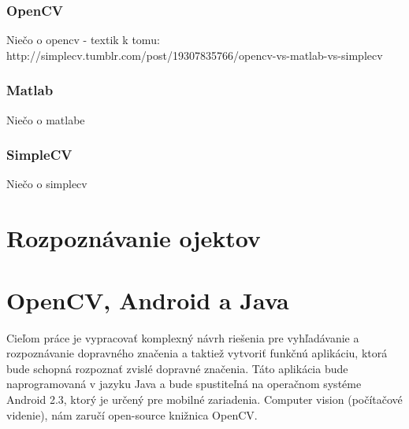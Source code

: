\documentclass[12pt]{article}
\begin{document}
\subsubsection{OpenCV}
Niečo o opencv - textik k tomu:
http://simplecv.tumblr.com/post/19307835766/opencv-vs-matlab-vs-simplecv
\subsubsection{Matlab}
Niečo o matlabe
\subsubsection{SimpleCV}
Niečo o simplecv

\section{Rozpoznávanie ojektov}
\section{OpenCV, Android a Java}
Cieľom práce je vypracovať komplexný návrh riešenia pre vyhľadávanie a rozpoznávanie dopravného značenia a taktiež vytvoriť funkčnú aplikáciu, ktorá
bude schopná rozpoznať zvislé dopravné značenia. Táto aplikácia bude naprogramovaná v jazyku Java a bude spustiteľná na
 operačnom systéme Android 2.3, ktorý je určený pre mobilné zariadenia. Computer vision (počítačové videnie), nám zaručí open-source knižnica OpenCV.
\end{document}
